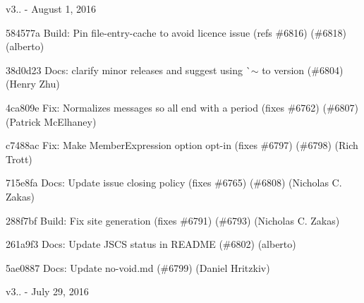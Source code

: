 v3.. -\/ August 1, 2016


\begin{DoxyItemize}
\item 584577a Build\+: Pin file-\/entry-\/cache to avoid licence issue (refs \#6816) (\#6818) (alberto)
\item 38d0d23 Docs\+: clarify minor releases and suggest using \`{}$\sim$ to version (\#6804) (Henry Zhu)
\item 4ca809e Fix\+: Normalizes messages so all end with a period (fixes \#6762) (\#6807) (Patrick Mc\+Elhaney)
\item c7488ac Fix\+: Make Member\+Expression option opt-\/in (fixes \#6797) (\#6798) (Rich Trott)
\item 715e8fa Docs\+: Update issue closing policy (fixes \#6765) (\#6808) (Nicholas C. Zakas)
\item 288f7bf Build\+: Fix site generation (fixes \#6791) (\#6793) (Nicholas C. Zakas)
\item 261a9f3 Docs\+: Update J\+S\+CS status in R\+E\+A\+D\+ME (\#6802) (alberto)
\item 5ae0887 Docs\+: Update no-\/void.\+md (\#6799) (Daniel Hritzkiv)
\end{DoxyItemize}

v3.. -\/ July 29, 2016


